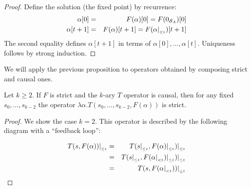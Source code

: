 \begin{proof}
Define the solution (the fixed point) by recurrence:
\begin{eqnarray*}
\alpha[0] & = &  F(\alpha)[0]=F(0_{\mathcal{S}_{A}})[0]\\
\alpha[t+1] & = & F(\alpha)[t+1]=F(\alpha|_{_{\leq t}})[t+1]
\end{eqnarray*}
The second equality defines $\alpha[t+1]$ in terms of $\alpha[0],\ldots,\alpha[t]$.
Uniqueness follows by strong induction.

\qquad
\end{proof}

We will apply the previous proposition to operators obtained by composing strict and causal ones.
\begin{lemma}
\label{lemma-causal-strict}
Let $k\geq 2$. If $F$ is strict and the $k$-ary $T$ operator is causal, then for any
fixed $s_0,\ldots,s_{k-2}$ the operator
$\lambda\alpha.T(s_0,\ldots,s_{k-2},F(\alpha))$ is strict.
\end{lemma}

\begin{proof} We show the case $k=2$.
This operator is described by the following diagram with a ``feedback loop'':

\begin{center}
\end{center}
\begin{eqnarray*}
T(s,F(\alpha))|_{_{\leq t}} & = & T(s|_{_{\leq t}},F(\alpha)|_{_{\leq t}})|_{_{\leq t}}\\
                   & = & T(s|_{_{\leq t}},F(\alpha|_{_{< t}})|_{_{\leq t}})|_{_{\leq t}}\\
                   & = & T(s,F(\alpha|_{_{< t}}))|_{_{\leq t}}
\end{eqnarray*}
\qquad
\end{proof}



